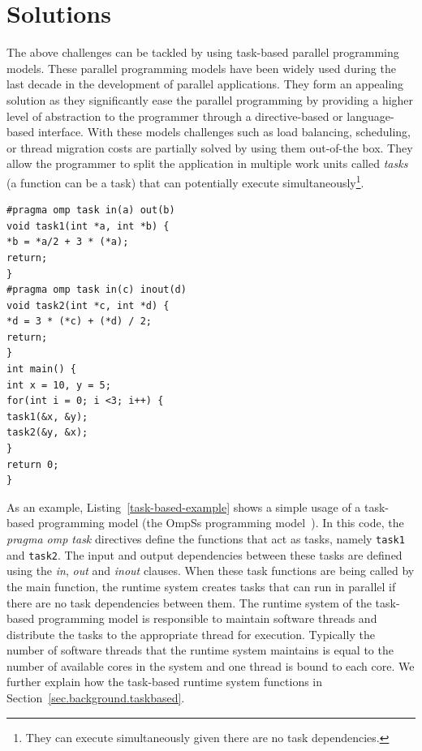 \section{Solutions}
The above challenges can be tackled by using task-based parallel programming models.
These parallel programming models have been widely used during the last decade in the development of parallel applications.
They form an appealing solution as they significantly ease the parallel programming by providing a higher level of abstraction to the programmer through a directive-based or language-based interface.
With these models challenges such as load balancing, scheduling, or thread migration costs are partially solved by using them out-of-the box.
They allow the programmer to split the application in multiple work units called \textit{tasks} (a function can be a task) that can potentially execute simultaneously\footnote{They can execute simultaneously given there are no task dependencies.}.
\begin{lstlisting}[float, emph={void,if,return}, captionpos=b, caption={Example code using the OmpSs task-based programming model.},label=task-based-example, emph={[2]mat}, emphstyle={[3]}, aboveskip={0\baselineskip}, frame=tb, belowskip={0\baselineskip}]
#pragma omp task in(a) out(b)
void task1(int *a, int *b) {
*b = *a/2 + 3 * (*a);
return;
}
#pragma omp task in(c) inout(d)
void task2(int *c, int *d) {
*d = 3 * (*c) + (*d) / 2;
return;
}
int main() { 
int x = 10, y = 5;
for(int i = 0; i <3; i++) {
task1(&x, &y);
task2(&y, &x);
}
return 0;
}
\end{lstlisting}
As an example, Listing~\ref{task-based-example} shows a simple usage of a task-based programming model (the OmpSs programming model~\cite{OmpSs}).
In this code, the \textit{pragma omp task} directives define the functions that act as tasks, namely \texttt{task1} and \texttt{task2}.
The input and output dependencies between these tasks are defined using the \textit{in}, \textit{out} and \textit{inout} clauses.
When these task functions are being called by the main function, the runtime system creates tasks that can run in parallel if there are no task dependencies between them.
The runtime system of the task-based programming model is responsible to maintain software threads and distribute the tasks to the appropriate thread for execution.
Typically the number of software threads that the runtime system maintains is equal to the number of available cores in the system and one thread is bound to each core.
We further explain how the task-based runtime system functions in Section~\ref{sec.background.taskbased}.



